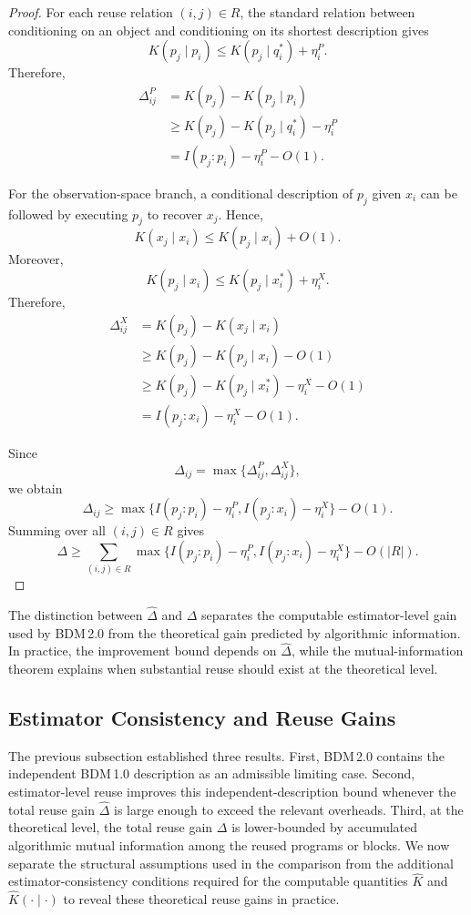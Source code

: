 \documentclass{article}
\begin{document}
\begin{proof}
For each reuse relation \((i,j)\in R\), the standard relation between conditioning on an object and conditioning on its shortest description gives
\[
K(p_j\mid p_i)
\leq
K(p_j\mid q_i^*)+\eta_i^P.
\]
Therefore,
\[
\begin{aligned}
\Delta_{ij}^{P}
&=
K(p_j)-K(p_j\mid p_i) \\
&\geq
K(p_j)-K(p_j\mid q_i^*)-\eta_i^P \\
&=
I(p_j:p_i)-\eta_i^P-O(1).
\end{aligned}
\]

For the observation-space branch, a conditional description of \(p_j\) given \(x_i\) can be followed by executing \(p_j\) to recover \(x_j\). Hence,
\[
K(x_j\mid x_i)
\leq
K(p_j\mid x_i)+O(1).
\]
Moreover,
\[
K(p_j\mid x_i)
\leq
K(p_j\mid x_i^*)+\eta_i^X.
\]
Therefore,
\[
\begin{aligned}
\Delta_{ij}^{X}
&=
K(p_j)-K(x_j\mid x_i) \\
&\geq
K(p_j)-K(p_j\mid x_i)-O(1) \\
&\geq
K(p_j)-K(p_j\mid x_i^*)-\eta_i^X-O(1) \\
&=
I(p_j:x_i)-\eta_i^X-O(1).
\end{aligned}
\]

Since
\[
\Delta_{ij}
=
\max\{\Delta_{ij}^{P},\Delta_{ij}^{X}\},
\]
we obtain
\[
\Delta_{ij}
\geq
\max\{
I(p_j:p_i)-\eta_i^P,
I(p_j:x_i)-\eta_i^X
\}
-
O(1).
\]
Summing over all \((i,j)\in R\) gives
\[
\Delta
\geq
\sum_{(i,j)\in R}
\max\{
I(p_j:p_i)-\eta_i^P,
I(p_j:x_i)-\eta_i^X
\}
-
O(|R|).
\]

\end{proof}

The distinction between \(\hat{\Delta}\) and \(\Delta\) separates the computable estimator-level gain used by BDM\,2.0 from the theoretical gain predicted by algorithmic information. In practice, the improvement bound depends on \(\hat{\Delta}\), while the mutual-information theorem explains when substantial reuse should exist at the theoretical level.

\subsection[Estimator Consistency and Reuse Gains]
{Estimator Consistency and Reuse Gains}
\label{sub:estimator-consistency-reuse-gain}

The previous subsection established three results. First, BDM\,2.0 contains the independent BDM\,1.0 description as an admissible limiting case. Second, estimator-level reuse improves this independent-description bound whenever the total reuse gain \(\hat{\Delta}\) is large enough to exceed the relevant overheads. Third, at the theoretical level, the total reuse gain \(\Delta\) is lower-bounded by accumulated algorithmic mutual information among the reused programs or blocks. We now separate the structural assumptions used in the comparison from the additional estimator-consistency conditions required for the computable quantities \(\hat K\) and \(\hat K(\cdot\mid\cdot)\) to reveal these theoretical reuse gains in practice.
\end{document}
